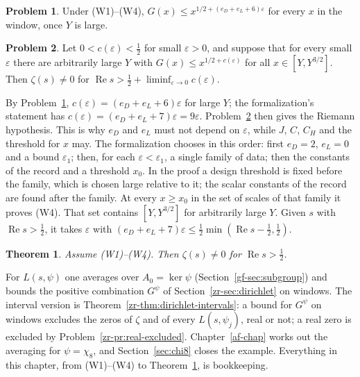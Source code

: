 \documentclass[reqno]{amsart}
\newcounter{chap}
\theoremstyle{definition}
\newtheorem{problem}{Problem}[section]
\theoremstyle{plain}
\newtheorem{theorem}{Theorem}[section]
\renewcommand{\Re}{\operatorname{Re}}
\begin{document}
\begin{problem}\label{pr:G}
Under (W1)--(W4), \(G(x) \le x^{1/2+(e_D+e_L+6)\varepsilon}\) for every \(x\) in the window, once \(Y\) is large.
\end{problem}

\begin{problem}\label{pr:close}
Let \(0 < c(\varepsilon) < \frac12\) for small \(\varepsilon > 0\), and suppose that for every small \(\varepsilon\) there are arbitrarily large \(Y\) with \(G(x) \le x^{1/2+c(\varepsilon)}\) for all \(x \in [Y, Y^{3/2}]\).  Then \(\zeta(s) \ne 0\) for \(\Re s > \frac12 + \liminf_{\varepsilon\to0} c(\varepsilon)\).
\end{problem}

By Problem~\ref{pr:G}, \(c(\varepsilon) = (e_D + e_L + 6)\varepsilon\) for large \(Y\); the formalization's statement has \(c(\varepsilon) = (e_D + e_L + 7)\varepsilon = 9\varepsilon\).  Problem~\ref{pr:close} then gives the Riemann hypothesis.  This is why \(e_D\) and \(e_L\) must not depend on \(\varepsilon\), while \(J\), \(C\), \(C_H\) and the threshold for \(x\) may.  The formalization chooses in this order: first \(e_D = 2\), \(e_L = 0\) and a bound \(\varepsilon_1\); then, for each \(\varepsilon < \varepsilon_1\), a single family of data; then the constants of the record and a threshold \(x_0\).  In the proof a design threshold is fixed before the family, which is chosen large relative to it; the scalar constants of the record are found after the family.  At every \(x \ge x_0\) in the set of scales of that family it proves (W4).  That set contains \([Y, Y^{3/2}]\) for arbitrarily large \(Y\).  Given \(s\) with \(\Re s > \frac12\), it takes \(\varepsilon\) with \((e_D + e_L + 7)\varepsilon \le \frac12\min(\Re s - \frac12, \frac12)\).

\begin{theorem}\label{thm:RH}
Assume (W1)--(W4).  Then \(\zeta(s) \ne 0\) for \(\Re s > \frac12\).
\end{theorem}

For \(L(s, \psi)\) one averages over \(A_0 = \ker\psi\) (Section~\ref{gf-sec:subgroup}) and bounds the positive combination \(G^\psi\) of Section~\ref{zr-sec:dirichlet} on windows.  The interval version is Theorem~\ref{zr-thm:dirichlet-intervals}: a bound for \(G^\psi\) on windows excludes the zeros of \(\zeta\) and of every \(L(s,\psi_j)\), real or not; a real zero is excluded by Problem~\ref{zr-pr:real-excluded}.  Chapter~\ref{af-chap} works out the averaging for \(\psi = \chi_8\), and Section~\ref{sec:chi8} closes the example.  Everything in this chapter, from (W1)--(W4) to Theorem~\ref{thm:RH}, is bookkeeping.
\end{document}
